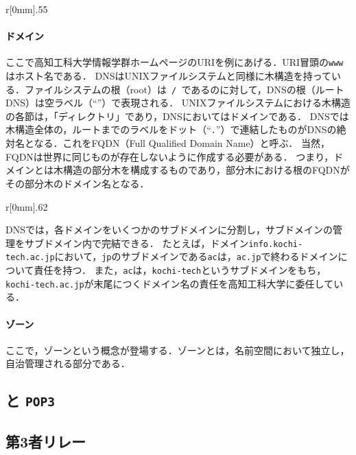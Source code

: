 \newcommand{\popt}{\texttt{POP3}}
\begin{wrapfigure}{r}[0mm]{.55\textwidth}
    \centering
    
\end{wrapfigure}
\paragraph{ドメイン}
ここで高知工科大学情報学群ホームページのURIを例にあげる．URI冒頭の\texttt{www}はホスト名である．
DNSはUNIXファイルシステムと同様に木構造を持っている．ファイルシステムの根（root）は\texttt{\ /\ }であるのに対して，DNSの根（ルートDNS）は空ラベル（``''）で表現される．
UNIXファイルシステムにおける木構造の各節は，「ディレクトリ」であり，DNSにおいてはドメインである．
DNSでは木構造全体の，ルートまでのラベルをドット（``\texttt{.}''）で連結したものがDNSの絶対名となる．これをFQDN（Full Qualified Domain Name）と呼ぶ．
当然，FQDNは世界に同じものが存在しないように作成する必要がある．
つまり，ドメインとは木構造の部分木を構成するものであり，部分木における根のFQDNがその部分木のドメイン名となる．

\begin{wrapfigure}{r}[0mm]{.62\textwidth}
    \centering
    
\end{wrapfigure}
DNSでは，各ドメインをいくつかのサブドメインに分割し，サブドメインの管理をサブドメイン内で完結できる．
たとえば，ドメイン\texttt{info.kochi-tech.ac.jp}において，\texttt{jp}のサブドメインである\texttt{ac}は，\texttt{ac.jp}で終わるドメインについて責任を持つ．
また，\texttt{ac}は，\texttt{kochi-tech}というサブドメインをもち，\texttt{kochi-tech.ac.jp}が末尾につくドメイン名の責任を高知工科大学に委任している．
\paragraph{ゾーン}ここで，ゾーンという概念が登場する．ゾーンとは，名前空間において独立し，自治管理される部分である．
\subsection{\smtp と \popt}\label{chap:smtppop}
\subsection{第3者リレー}